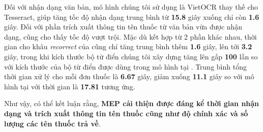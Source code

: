 Đối với nhận dạng văn bản, mô hình chúng tôi sử dụng là VietOCR thay thế cho Tesseract, giúp tăng tốc độ nhận dạng trung bình từ \textbf{15.8} giây xuống chỉ còn\textbf{ 1.6} giây. Đối với phần trích xuất thông tin tên thuốc từ văn bản vừa được nhận dạng,  cũng cho thấy tốc độ vượt trội. Mặc dù kết hợp từ 2 phần khác nhau, thời gian cho khâu \textit{recorrect} của  cũng chỉ tăng trung bình thêm \textbf{1.6} giây, lên tới \textbf{3.2} giây, trong khi kích thước bộ từ điển chúng tôi xây dựng tăng lên gấp \textbf{100} lần so với kích thước của bộ từ điển được dùng trong mô hình tại \cite{nguyen2021developing}. Trung bình tổng thời gian xử lý cho mỗi đơn thuốc là \textbf{6.67} giây, giảm xuống \textbf{11.1} giây so với mô hình tại \cite{nguyen2021developing} với thời gian là \textbf{17.81} tương ứng. 

Như vậy, có thể kết luận rằng, \textbf{MEP cải thiện được đáng kể thời gian nhận dạng và trích xuất thông tin tên thuốc cũng như độ chính xác và số lượng các tên thuốc trả về}.